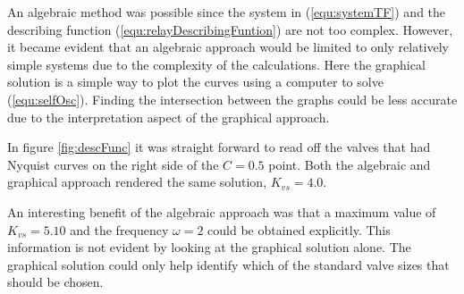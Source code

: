 \documentclass[a4paper, titlepage]{article}
\begin{document}
An algebraic method was possible since the system in (\ref{equ:systemTF}) and the describing function (\ref{equ:relayDescribingFuntion}) are not too complex.  However, it became evident that an algebraic approach would be limited to only relatively simple systems due to the complexity of the calculations.
Here the graphical solution is a simple way to plot the curves using a computer to solve (\ref{equ:selfOsc}).
Finding the intersection between the graphs could be less accurate due to the interpretation aspect of the graphical approach.

In figure \ref{fig:descFunc} it was straight forward to read off the valves that had Nyquist curves on the right side of the $C=0.5$ point.
Both the algebraic and graphical approach rendered the same solution, $K_{vs}=4.0$.

An interesting benefit of the algebraic approach was that a maximum value of $K_{vs}=5.10$ and the frequency $\omega = 2$ could be obtained explicitly. This information is not evident by looking at the graphical solution alone.  The graphical solution could only help identify which of the standard valve sizes that should be chosen.   


%
%
%
%
\end{document}
